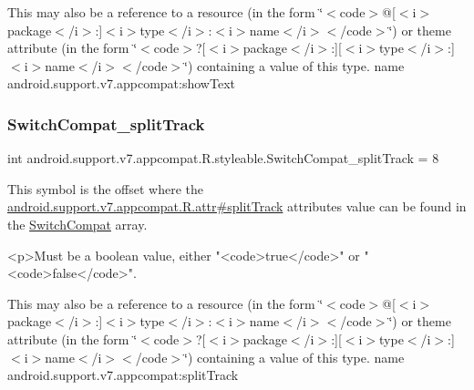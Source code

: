 This may also be a reference to a resource (in the form \char`\"{}$<$code$>$@\mbox{[}$<$i$>$package$<$/i$>$\+:\mbox{]}$<$i$>$type$<$/i$>$\+:$<$i$>$name$<$/i$>$$<$/code$>$\char`\"{}) or theme attribute (in the form \char`\"{}$<$code$>$?\mbox{[}$<$i$>$package$<$/i$>$\+:\mbox{]}\mbox{[}$<$i$>$type$<$/i$>$\+:\mbox{]}$<$i$>$name$<$/i$>$$<$/code$>$\char`\"{}) containing a value of this type.  name android.\+support.\+v7.\+appcompat\+:show\+Text \mbox{\label{classandroid_1_1support_1_1v7_1_1appcompat_1_1R_1_1styleable_aa41174bd1ec0a51b5ba86f4ac3002531}} 
\subsubsection{\texorpdfstring{Switch\+Compat\+\_\+split\+Track}{SwitchCompat\_splitTrack}}
{\footnotesize\ttfamily int android.\+support.\+v7.\+appcompat.\+R.\+styleable.\+Switch\+Compat\+\_\+split\+Track = 8\hspace{0.3cm}{\ttfamily [static]}}

This symbol is the offset where the \hyperlink{classandroid_1_1support_1_1v7_1_1appcompat_1_1R_1_1attr_a08513fcb56feb3b7b1bd74cf05b29675}{android.\+support.\+v7.\+appcompat.\+R.\+attr\#split\+Track} attribute\textquotesingle{}s value can be found in the \hyperlink{classandroid_1_1support_1_1v7_1_1appcompat_1_1R_1_1styleable_aabe688560752254f2288f3eaf9439737}{Switch\+Compat} array.

\begin{DoxyVerb}      <p>Must be a boolean value, either "<code>true</code>" or "<code>false</code>".
\end{DoxyVerb}
 

This may also be a reference to a resource (in the form \char`\"{}$<$code$>$@\mbox{[}$<$i$>$package$<$/i$>$\+:\mbox{]}$<$i$>$type$<$/i$>$\+:$<$i$>$name$<$/i$>$$<$/code$>$\char`\"{}) or theme attribute (in the form \char`\"{}$<$code$>$?\mbox{[}$<$i$>$package$<$/i$>$\+:\mbox{]}\mbox{[}$<$i$>$type$<$/i$>$\+:\mbox{]}$<$i$>$name$<$/i$>$$<$/code$>$\char`\"{}) containing a value of this type.  name android.\+support.\+v7.\+appcompat\+:split\+Track \mbox{\label{classandroid_1_1support_1_1v7_1_1appcompat_1_1R_1_1styleable_ae597e60df7253abca490d743cc73bd17}} 
